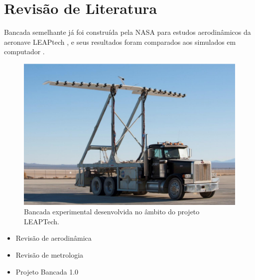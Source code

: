 \chapter{Revisão de Literatura}\label{chp:rev}

Bancada semelhante já foi construída pela NASA para estudos aerodinâmicos da aeronave LEAPtech \cite{murray2016leaptech}, e seus resultados foram comparados aos simulados em computador \cite{stoll2015comparison}.

\begin{figure}[!ht]
    \centering
    \includegraphics[width=.8\linewidth]{figuras/leaptech/leaptech1.png}
    \caption{Bancada experimental desenvolvida no âmbito do projeto LEAPTech\cite{murray2016leaptech}.}
    \label{fig:leaptech1}
\end{figure}

\begin{itemize}
    \item Revisão de aerodinâmica
    \item Revisão de metrologia
    \item Projeto Bancada 1.0
\end{itemize}